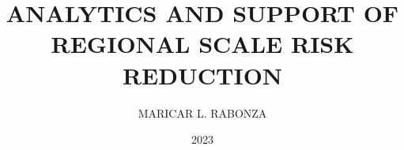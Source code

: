 \documentclass{class/kamoonaRmit}
\title{ANALYTICS AND SUPPORT OF REGIONAL SCALE RISK REDUCTION}
\subtitle{MARICAR L. RABONZA}
\affiliation{Asian School of the Environment \\
College of Science}
\date{2023}
\begin{document}
    \makefrontmatter
    
	\listoffigures
	\listoftables

    \cleardoublepage


    \ifdefined\isdraft
        \doublespacing
    \else
        \onehalfspacing
    \fi

     
     
     
     
     


    \begin{appendices}

        
        
        



    \end{appendices}
\end{document}
